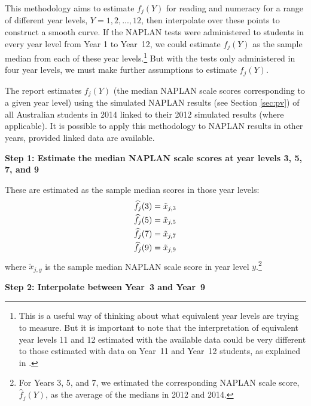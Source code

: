 This methodology aims to estimate $f_{j}(Y)$ for reading and numeracy for a range of different year levels, $Y = 1,2,...,12$, then interpolate over these points to construct a smooth curve. If the NAPLAN tests were administered to students in every year level from Year 1 to \mbox{Year 12}, we could estimate $f_{j}(Y)$ as the sample median from each of these year levels.\footnote{This is a useful way of thinking about what equivalent year levels are trying to measure. But it is important to note that the interpretation of equivalent year levels 11 and 12 estimated with the available data could be very different to those estimated with data on \mbox{Year 11} and \mbox{Year 12} students, as explained in .} But with the tests only administered in four year levels, we must make further assumptions to estimate $f_{j}(Y)$.

The report estimates $f_{j}(Y)$ (the median NAPLAN scale scores corresponding to a given year level) using the simulated NAPLAN results (see Section \ref{sec:pv}) of all Australian students in 2014 linked to their 2012 simulated results (where applicable). It is possible to apply this methodology to NAPLAN results in other years, provided linked data are available.

\textbf{Step 1: Estimate the median NAPLAN scale scores at year levels 3, 5, 7, and 9}
\nopagebreak

These are estimated as the sample median scores in those year levels:
\begin{equation} \begin{array}{c}
\widehat{f}_{j}(3) = \tilde{x}_{j,3} \vspace{0.3em}\\ \widehat{f}_{j}(5) = \tilde{x}_{j,5} \vspace{0.3em}\\ \widehat{f}_{j}(7) = \tilde{x}_{j,7} \vspace{0.3em}\\
\widehat{f}_{j}(9) = \tilde{x}_{j,9}
\end{array} \end{equation}
where $\tilde{x}_{j,y}$ is the sample median NAPLAN scale score in year level $y$.\footnote{For Years 3, 5, and 7, we estimated the corresponding NAPLAN scale score, $\widehat{f}_{j}(Y)$, as the average of the medians in 2012 and 2014.}

\vspace{9pt}
\textbf{Step 2: Interpolate between \mbox{Year 3} and \mbox{Year 9}}
\nopagebreak

